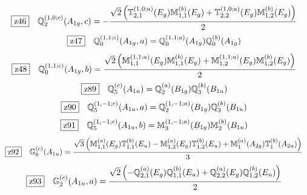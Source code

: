 \documentclass[fleqn,10pt,landscape]{jsarticle}
\begin{document}
\begin{dmath*}
\hspace*{3mm}\fbox{z46}\quad \mathbb{Q}_{2}^{(1,0;c)}(A_{1g},c)=- \frac{\sqrt{2} \left(\mathbb{T}_{2,1}^{(1,0;a)}(E_{g}) \mathbb{M}_{1,1}^{(b)}(E_{g}) + \mathbb{T}_{2,2}^{(1,0;a)}(E_{g}) \mathbb{M}_{1,2}^{(b)}(E_{g})\right)}{2}
\end{dmath*}
\begin{dmath*}
\hspace*{3mm}\fbox{z47}\quad \mathbb{Q}_{0}^{(1,1;c)}(A_{1g},a)=\mathbb{Q}_{0}^{(1,1;a)}(A_{1g}) \mathbb{Q}_{0}^{(b)}(A_{1g})
\end{dmath*}
\begin{dmath*}
\hspace*{3mm}\fbox{z48}\quad \mathbb{Q}_{0}^{(1,1;c)}(A_{1g},b)=\frac{\sqrt{2} \left(\mathbb{M}_{1,1}^{(1,1;a)}(E_{g}) \mathbb{M}_{1,1}^{(b)}(E_{g}) + \mathbb{M}_{1,2}^{(1,1;a)}(E_{g}) \mathbb{M}_{1,2}^{(b)}(E_{g})\right)}{2}
\end{dmath*}
\begin{dmath*}
\hspace*{3mm}\fbox{z89}\quad \mathbb{Q}_{5}^{(c)}(A_{1u})=\mathbb{Q}_{2}^{(a)}(B_{1g}) \mathbb{Q}_{3}^{(b)}(B_{1u})
\end{dmath*}
\begin{dmath*}
\hspace*{3mm}\fbox{z90}\quad \mathbb{Q}_{5}^{(1,-1;c)}(A_{1u},a)=\mathbb{Q}_{2}^{(1,-1;a)}(B_{1g}) \mathbb{Q}_{3}^{(b)}(B_{1u})
\end{dmath*}
\begin{dmath*}
\hspace*{3mm}\fbox{z91}\quad \mathbb{Q}_{5}^{(1,-1;c)}(A_{1u},b)=\mathbb{M}_{3}^{(1,-1;a)}(B_{1g}) \mathbb{M}_{2}^{(b)}(B_{1u})
\end{dmath*}
\begin{dmath*}
\hspace*{3mm}\fbox{z92}\quad \mathbb{G}_{0}^{(c)}(A_{1u})=\frac{\sqrt{3} \left(\mathbb{M}_{1,1}^{(a)}(E_{g}) \mathbb{T}_{1,1}^{(b)}(E_{u}) - \mathbb{M}_{1,2}^{(a)}(E_{g}) \mathbb{T}_{1,2}^{(b)}(E_{u}) + \mathbb{M}_{1}^{(a)}(A_{2g}) \mathbb{T}_{1}^{(b)}(A_{2u})\right)}{3}
\end{dmath*}
\begin{dmath*}
\hspace*{3mm}\fbox{z93}\quad \mathbb{G}_{2}^{(c)}(A_{1u},a)=\frac{\sqrt{2} \left(- \mathbb{Q}_{2,1}^{(a)}(E_{g}) \mathbb{Q}_{1,1}^{(b)}(E_{u}) + \mathbb{Q}_{2,2}^{(a)}(E_{g}) \mathbb{Q}_{1,2}^{(b)}(E_{u})\right)}{2}
\end{dmath*}
\end{document}
